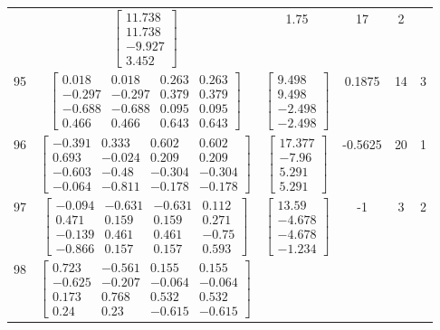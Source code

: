 \documentclass[a4paper,12pt]{article}
\begin{document}
\begin{tabular}{c c c c c c}
&
$\begin{bmatrix} 11.738 \\ 11.738 \\ -9.927 \\ 3.452 \end{bmatrix}$
&
1.75
&
17
&
2
\\
95
&
$\begin{bmatrix} 0.018 & 0.018 & 0.263 & 0.263 \\ -0.297 & -0.297 & 0.379 & 0.379 \\ -0.688 & -0.688 & 0.095 & 0.095 \\ 0.466 & 0.466 & 0.643 & 0.643 \end{bmatrix}$
&
$\begin{bmatrix} 9.498 \\ 9.498 \\ -2.498 \\ -2.498 \end{bmatrix}$
&
0.1875
&
14
&
3
\\
96
&
$\begin{bmatrix} -0.391 & 0.333 & 0.602 & 0.602 \\ 0.693 & -0.024 & 0.209 & 0.209 \\ -0.603 & -0.48 & -0.304 & -0.304 \\ -0.064 & -0.811 & -0.178 & -0.178 \end{bmatrix}$
&
$\begin{bmatrix} 17.377 \\ -7.96 \\ 5.291 \\ 5.291 \end{bmatrix}$
&
-0.5625
&
20
&
1
\\
97
&
$\begin{bmatrix} -0.094 & -0.631 & -0.631 & 0.112 \\ 0.471 & 0.159 & 0.159 & 0.271 \\ -0.139 & 0.461 & 0.461 & -0.75 \\ -0.866 & 0.157 & 0.157 & 0.593 \end{bmatrix}$
&
$\begin{bmatrix} 13.59 \\ -4.678 \\ -4.678 \\ -1.234 \end{bmatrix}$
&
-1
&
3
&
2
\\
98
&
$\begin{bmatrix} 0.723 & -0.561 & 0.155 & 0.155 \\ -0.625 & -0.207 & -0.064 & -0.064 \\ 0.173 & 0.768 & 0.532 & 0.532 \\ 0.24 & 0.23 & -0.615 & -0.615 \end{bmatrix}$

\end{tabular}
\end{document}
